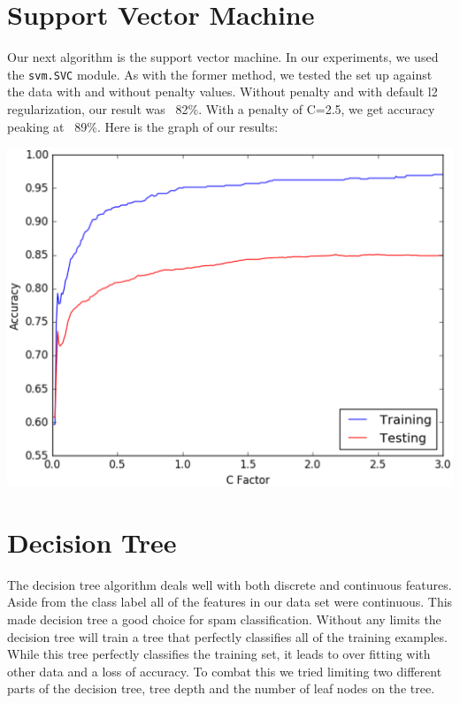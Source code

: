 \documentclass{article} %
\begin{document}
\section{Support Vector Machine}
Our next algorithm is the support vector machine. In our experiments, we used the
\texttt{svm.SVC} module. As with the former method, we tested the set up against
the data with and without penalty values. Without penalty and with default l2
regularization, our result was ~82\%. With a penalty of C=2.5, we get accuracy
peaking at ~89\%. Here is the graph of our results:

\includegraphics[scale=.5]{svm-accuracy_2_.eps}

\section{Decision Tree}
The decision tree algorithm deals well with both discrete and continuous features.
Aside from the class label all of the features in our data set were continuous.
This made decision tree a good choice for spam classification. Without any limits
the decision tree will train a tree that perfectly classifies all of the training
examples. While this tree perfectly classifies the training set, it leads to over
fitting with other data and a loss of accuracy. To combat this we tried limiting
two different parts of the decision tree, tree depth and the number of leaf nodes
on the tree.
\end{document}
